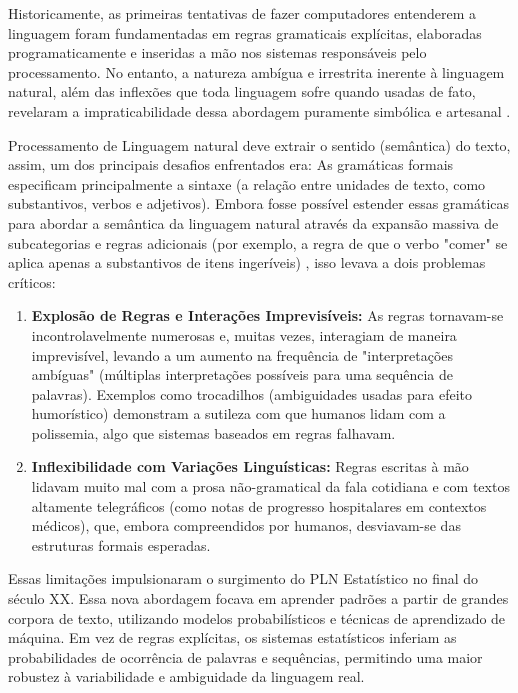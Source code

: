 Historicamente, as primeiras tentativas de fazer computadores entenderem a linguagem foram fundamentadas em regras gramaticais explícitas, elaboradas programaticamente e inseridas a mão nos sistemas responsáveis pelo processamento. No entanto, a natureza ambígua e irrestrita inerente à linguagem natural, além das inflexões que toda linguagem sofre quando usadas de fato, revelaram a impraticabilidade dessa abordagem puramente simbólica e artesanal \cite{nadkarni_natural_2011}.

Processamento de Linguagem natural deve extrair o sentido (semântica) do texto, assim, um dos principais desafios enfrentados era: As gramáticas formais especificam principalmente a sintaxe (a relação entre unidades de texto, como substantivos, verbos e adjetivos). Embora fosse possível estender essas gramáticas para abordar a semântica da linguagem natural através da expansão massiva de subcategorias e regras adicionais (por exemplo, a regra de que o verbo "comer" se aplica apenas a substantivos de itens ingeríveis) \cite{nadkarni_natural_2011}, isso levava a dois problemas críticos:

\begin{enumerate}
    \item \textbf{Explosão de Regras e Interações Imprevisíveis:} As regras tornavam-se incontrolavelmente numerosas e, muitas vezes, interagiam de maneira imprevisível, levando a um aumento na frequência de "interpretações ambíguas" (múltiplas interpretações possíveis para uma sequência de palavras). Exemplos como trocadilhos (ambiguidades usadas para efeito humorístico) demonstram a sutileza com que humanos lidam com a polissemia, algo que sistemas baseados em regras falhavam.
    \item \textbf{Inflexibilidade com Variações Linguísticas:} Regras escritas à mão lidavam muito mal com a prosa não-gramatical da fala cotidiana e com textos altamente telegráficos (como notas de progresso hospitalares em contextos médicos), que, embora compreendidos por humanos, desviavam-se das estruturas formais esperadas.
\end{enumerate}

Essas limitações impulsionaram o surgimento do PLN Estatístico no final do século XX. Essa nova abordagem focava em aprender padrões a partir de grandes corpora de texto, utilizando modelos probabilísticos e técnicas de aprendizado de máquina. Em vez de regras explícitas, os sistemas estatísticos inferiam as probabilidades de ocorrência de palavras e sequências, permitindo uma maior robustez à variabilidade e ambiguidade da linguagem real.

